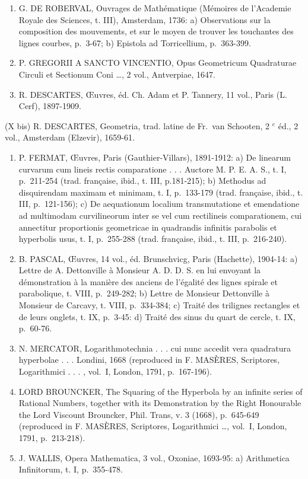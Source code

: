 \begin{enumerate}
\def\labelenumi{(\Roman{enumi})}
\setcounter{enumi}{7}
\item
  G. DE ROBERVAL, Ouvrages de Mathématique (Mémoires de l'Academie Royale des Sciences, t. III), Amsterdam, 1736: a) Observations sur la composition des mouvements, et sur le moyen de trouver les touchantes des lignes courbes, p.~3-67; b) Epistola ad Torricellium, p.~363-399.
\item
  P. GREGORII A SANCTO VINCENTIO, Opus Geometricum Quadraturae Circuli et Sectionum Coni \ldots, 2 vol., Antverpiae, 1647.
\item
  R. DESCARTES, Œuvres, éd. Ch. Adam et P. Tannery, 11 vol., Paris (L. Cerf), 1897-1909.
\end{enumerate}

(X bis) R. DESCARTES, Geometria, trad. latine de Fr.~van Schooten, 2 \(^{e}\) éd., 2 vol., Amsterdam (Elzevir), 1659-61.

\begin{enumerate}
\def\labelenumi{(\Roman{enumi})}
\setcounter{enumi}{10}
\item
  P. FERMAT, Œuvres, Paris (Gauthier-Villars), 1891-1912: a) De linearum curvarum cum lineis rectis comparatione . . . Auctore M. P. E. A. S., t. I, p.~211-254 (trad. française, ibid., t. III, p.181-215); b) Methodus ad disquirendam maximam et minimam, t. I, p.~133-179 (trad. française, ibid., t. III, p.~121-156); c) De aequationum localium transmutatione et emendatione ad multimodam curvilineorum inter se vel cum rectilineis comparationem, cui annectitur proportionis geometricae in quadrandis infinitis parabolis et hyperbolis usus, t. I, p.~255-288 (trad. française, ibid., t. III, p.~216-240).
\item
  B. PASCAL, Œuvres, 14 vol., éd. Brunschvicg, Paris (Hachette), 1904-14: a) Lettre de A. Dettonville à Monsieur A. D. D. S. en lui envoyant la démonstration à la manière des anciens de l'égalité des lignes spirale et parabolique, t. VIII, p.~249-282; b) Lettre de Monsieur Dettonville à Monsieur de Carcavy, t. VIII, p.~334-384; c) Traité des trilignes rectangles et de leurs onglets, t. IX, p.~3-45: d) Traité des sinus du quart de cercle, t. IX, p.~60-76.
\item
  N. MERCATOR, Logarithmotechnia . . . cui nunc accedit vera quadratura hyperbolae . . . Londini, 1668 (reproduced in F. MASÈRES, Scriptores, Logarithmici . . . , vol.~I, London, 1791, p.~167-196).
\item
  LORD BROUNCKER, The Squaring of the Hyperbola by an infinite series of Rational Numbers, together with its Demonstration by the Right Honourable the Lord Viscount Brouncker, Phil. Trans, v. 3 (1668), p.~645-649 (reproduced in F. MASÈRES, Scriptores, Logarithmici \ldots, vol.~I, London, 1791, p.~213-218).
\item
  J. WALLIS, Opera Mathematica, 3 vol., Oxoniae, 1693-95: a) Arithmetica Infinitorum, t. I, p.~355-478.
\end{enumerate}

